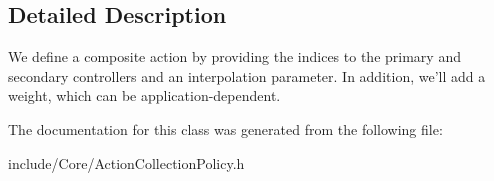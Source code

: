 \subsection{Detailed Description}
We define a composite action by providing the indices to the primary and secondary controllers and an interpolation parameter. In addition, we'll add a weight, which can be application-\/dependent. 

The documentation for this class was generated from the following file:\begin{DoxyCompactItemize}
\item 
include/Core/ActionCollectionPolicy.h\end{DoxyCompactItemize}
